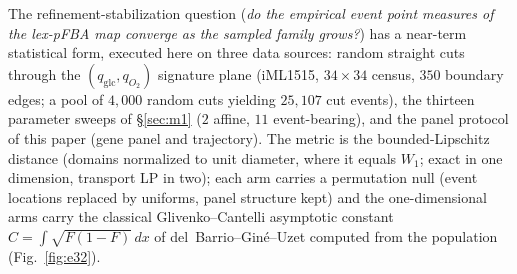 \documentclass[11pt,a4paper]{article}
\theoremstyle{plain}
\theoremstyle{definition}
\theoremstyle{remark}
\begin{document}
The refinement-stabilization question
(\emph{do the empirical event point measures of the
lex-pFBA map converge as the sampled family grows?}) has a near-term statistical form, executed here on three data sources: random straight cuts through the $(q_{\mathrm{glc}}, q_{O_2})$ signature plane (iML1515, $34\times34$
census, $350$ boundary edges; a pool of $4{,}000$ random cuts
yielding $25{,}107$ cut events), the thirteen parameter sweeps of \S\ref{sec:m1} ($2$ affine, $11$ event-bearing), and the panel protocol of this paper (gene panel and trajectory). The metric is the bounded-Lipschitz
distance (domains normalized to unit diameter, where it equals
$W_1$; exact in one dimension, transport LP in two); each arm carries
a permutation null (event locations replaced by uniforms, panel
structure kept) and the one-dimensional arms carry the classical
Glivenko--Cantelli asymptotic constant
$C = \int\sqrt{F(1-F)}\,dx$ of del~Barrio--Gin\'e--Uzet computed from
the population (Fig.~\ref{fig:e32}).
\end{document}
